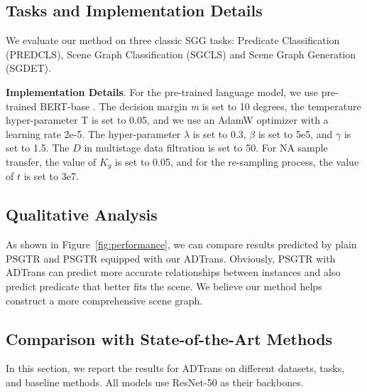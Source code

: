 \documentclass[letterpaper]{article} %
\begin{document}
\subsection{Tasks and Implementation Details}

 We evaluate our method on three classic SGG tasks: Predicate Classification (PREDCLS), Scene Graph Classification (SGCLS) and Scene Graph Generation (SGDET).

\noindent\textbf{Implementation Details}. For the pre-trained language model, we use pre-trained {BERT-base} \cite{devlin-etal-2019-bert}. The decision margin \textit{m} is set to 10 degrees, the temperature hyper-parameter T is set to 0.05, and we use an AdamW \cite{Loshchilov} optimizer with a learning rate 2e-5. The hyper-parameter $ \lambda $ is set to 0.3, $ \beta $ is set to 5e5, and $ \gamma $ is set to 1.5.  The $ D $ in multistage data filtration is set to 50. For NA sample transfer, the value of $K_g$ is set to 0.05, and for the re-sampling process, the value of $t$ is set to 3e7.



\subsection{Qualitative Analysis}
As shown in Figure~\ref{fig:performance}, we can compare results predicted by plain PSGTR and PSGTR equipped with our ADTrans. Obviously, PSGTR with ADTrans can predict more accurate relationships between instances and also predict predicate that better fits the scene.
We believe our method helps construct a more comprehensive scene graph.


\subsection{Comparison with State-of-the-Art Methods}
In this section, we report the results for ADTrans on different datasets, tasks, and baseline methods. All models use ResNet-50 \cite{He_2016_CVPR} as their backbones.
\end{document}
